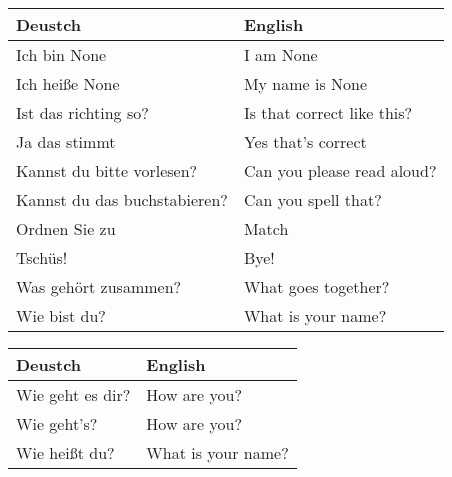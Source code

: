 \documentclass{article}
\renewcommand{\arraystretch}{1}
\begin{document}
\begin{minipage}{0.48\textwidth}
    \centering
    \renewcommand{\arraystretch}{1.5}
    \begin{tabular}{|>{\raggedright\arraybackslash}p{3.5cm}|>{\raggedright\arraybackslash}p{3.5cm}|}
        \hline
        \rowcolor{gray!20} \textbf{Deustch} & \textbf{English} \\
        \hline
        Ich bin None & I am None \\\hline
        Ich hei\ss{}e None & My name is None \\\hline
        Ist das richting so? & Is that correct like this? \\\hline
        Ja das stimmt & Yes that's correct \\\hline
        Kannst du bitte vorlesen? &  Can you please read aloud? \\\hline
        Kannst du das buchstabieren? & Can you spell that? \\\hline
        Ordnen Sie zu & Match \\\hline
        Tschüs! & Bye! \\\hline
        Was gehört zusammen? & What goes together? \\\hline
        Wie bist du? & What is your name? \\\hline
    \end{tabular}
\end{minipage}

\newpage

\begin{minipage}{0.48\textwidth}
    \centering
    \renewcommand{\arraystretch}{1.5}
    \begin{tabular}{|>{\raggedright\arraybackslash}p{3.5cm}|>{\raggedright\arraybackslash}p{3.5cm}|}
        \hline
        \rowcolor{gray!20} \textbf{Deustch} & \textbf{English} \\
        \hline
        Wie geht es dir? &  How are you? \\\hline
        Wie geht's? &  How are you? \\\hline
        Wie hei\ss{}t du? & What is your name? \\\hline
    \end{tabular}
\end{minipage}%
\end{document}
